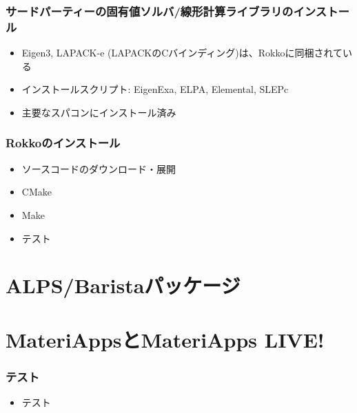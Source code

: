 \begin{frame}
  \frametitle{サードパーティーの固有値ソルバ/線形計算ライブラリのインストール}
  \begin{itemize}
  \item Eigen3, LAPACK-e (LAPACKのCバインディング)は、Rokkoに同梱されている
  \item インストールスクリプト: EigenExa, ELPA, Elemental, SLEPc
  \item 主要なスパコンにインストール済み
  \end{itemize}
\end{frame}

\begin{frame}
  \frametitle{Rokkoのインストール}
  \begin{itemize}
  \item ソースコードのダウンロード・展開
  \item CMake
  \item Make
  \item テスト
  \end{itemize}
\end{frame}


\section{ALPS/Baristaパッケージ}
\section{MateriAppsとMateriApps LIVE!}

\begin{frame}
  \frametitle{テスト}
  \begin{itemize}
  \item テスト
  \end{itemize}
\end{frame}


